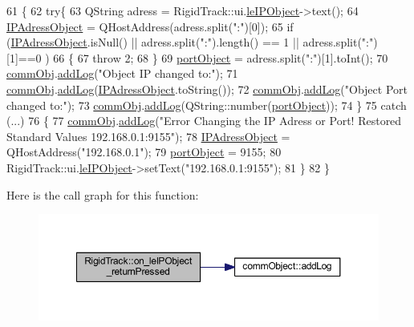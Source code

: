 \begin{DoxyCode}
61 \{
62     \textcolor{keywordflow}{try}\{
63     QString adress = RigidTrack::ui.\hyperlink{class_ui___rigid_track_class_a8372ffd3f54aa2672228e28e48fe18f3}{leIPObject}->text();
64     \hyperlink{main_8cpp_ab97ac0d82b1753d0eef37089be17e5e1}{IPAdressObject} = QHostAddress(adress.split(\textcolor{stringliteral}{":"})[0]);
65     \textcolor{keywordflow}{if} (\hyperlink{main_8cpp_ab97ac0d82b1753d0eef37089be17e5e1}{IPAdressObject}.isNull() || adress.split(\textcolor{stringliteral}{":"}).length() == 1 || adress.split(\textcolor{stringliteral}{":"})[1]==0
      )
66     \{
67         \textcolor{keywordflow}{throw} 2;
68     \}
69     \hyperlink{main_8cpp_a9a00043c93a3362969c1c1fcd3a70fea}{portObject} = adress.split(\textcolor{stringliteral}{":"})[1].toInt();
70     \hyperlink{main_8cpp_af29e7fc07ae0979d5fb61b473241d33d}{commObj}.\hyperlink{classcomm_object_aec354c7099b3039083cc4224e071e022}{addLog}(\textcolor{stringliteral}{"Object IP changed to:"});
71     \hyperlink{main_8cpp_af29e7fc07ae0979d5fb61b473241d33d}{commObj}.\hyperlink{classcomm_object_aec354c7099b3039083cc4224e071e022}{addLog}(\hyperlink{main_8cpp_ab97ac0d82b1753d0eef37089be17e5e1}{IPAdressObject}.toString());
72     \hyperlink{main_8cpp_af29e7fc07ae0979d5fb61b473241d33d}{commObj}.\hyperlink{classcomm_object_aec354c7099b3039083cc4224e071e022}{addLog}(\textcolor{stringliteral}{"Object Port changed to:"});
73     \hyperlink{main_8cpp_af29e7fc07ae0979d5fb61b473241d33d}{commObj}.\hyperlink{classcomm_object_aec354c7099b3039083cc4224e071e022}{addLog}(QString::number(\hyperlink{main_8cpp_a9a00043c93a3362969c1c1fcd3a70fea}{portObject}));
74     \}
75     \textcolor{keywordflow}{catch} (...)
76     \{
77         \hyperlink{main_8cpp_af29e7fc07ae0979d5fb61b473241d33d}{commObj}.\hyperlink{classcomm_object_aec354c7099b3039083cc4224e071e022}{addLog}(\textcolor{stringliteral}{"Error Changing the IP Adress or Port! Restored Standard Values
       192.168.0.1:9155"});
78         \hyperlink{main_8cpp_ab97ac0d82b1753d0eef37089be17e5e1}{IPAdressObject} = QHostAddress(\textcolor{stringliteral}{"192.168.0.1"});
79         \hyperlink{main_8cpp_a9a00043c93a3362969c1c1fcd3a70fea}{portObject} = 9155;
80         RigidTrack::ui.\hyperlink{class_ui___rigid_track_class_a8372ffd3f54aa2672228e28e48fe18f3}{leIPObject}->setText(\textcolor{stringliteral}{"192.168.0.1:9155"});
81     \}
82 \}
\end{DoxyCode}
Here is the call graph for this function\+:\nopagebreak
\begin{figure}[H]
\begin{center}
\leavevmode
\includegraphics[width=350pt]{class_rigid_track_a9f037a061b2577815fc80e5e9f8d46d9_cgraph}
\end{center}
\end{figure}
